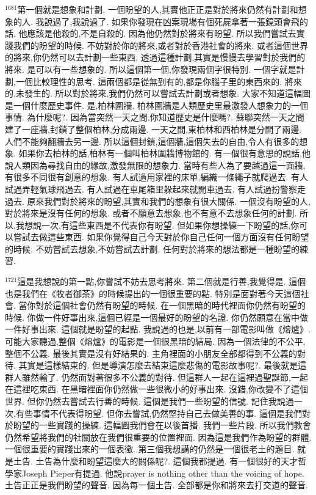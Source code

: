 \documentclass{book}
\begin{document}
$^{1681}$第一個就是想象和計劃.
一個盼望的人,其實他正正是對於將來仍然有計劃和想象的人.
我說過了,我說過了.
如果你發現在凶案現場有個死屍拿著一張鏡頭會飛的話.
他應該是他殺的,不是自殺的.
因為他仍然對於將來有盼望.
所以我們嘗試去實踐我們的盼望的時候.
不妨對於你的將來,或者對於香港社會的將來.
或者這個世界的將來,你仍然可以去計劃一些東西.
透過這種計劃,其實是慢慢去學習對於我們的將來.
是可以有一些想象的.
所以這個第一個,你發現兩個字很特別.
一個字就是計劃,一個比較理性的思考.
這兩個都是從無到有的,都是你腦子里的東西來的.
將來的,未發生的.
所以對於將來,我們仍然可以嘗試去計劃或者想象.
大家不知道這幅圖是一個什麼歷史事件.
是,柏林圍牆.
柏林圍牆是人類歷史里最激發人想象力的一個事情.
為什麼呢?.
因為當突然一天之間,你知道歷史是什麼嗎?.
蘇聯突然一天之間建了一座牆,封鎖了整個柏林,分成兩邊.
一天之間,東柏林和西柏林是分開了兩邊.
人們不能夠翻牆去另一邊.
所以這個封鎖,這個牆,這個失去的自由,令人有很多的想象.
如果你去柏林的話,柏林有一個叫柏林圍牆博物館的.
有一個很有意思的說話,他說人類因為尋找自由的緣故,激發無限的想象力.
當時有些人為了要越過這一面牆,有很多不同很有創意的想象.
有人試過用家裡的床單,編織一條繩子就爬過去.
有人試過弄輕氣球飛過去.
有人試過在車尾箱里躲起來就開車過去.
有人試過扮警察走過去.
原來我們對於將來的盼望,其實和我們的想象有很大關係.
一個沒有盼望的人,對於將來是沒有任何的想象.
或者不願意去想象,也不有意不去想象任何的計劃.
所以,我想說一次,有這些東西是不代表你有盼望.
但如果你想操練一下盼望的話,你可以嘗試去做這些東西.
如果你覺得自己今天對於你自己任何一個方面沒有任何盼望的時候.
不妨嘗試去想象,不妨嘗試去計劃.
任何對於將來的想法都是一種盼望的練習.

$^{1721}$這是我想說的第一點,你嘗試不妨去思考將來.
第二個就是行善,我覺得是.
這個也是我們在《牧者御茶》的時候提出的一個很重要的點.
特別是面對著今天這個社會.
當你對於這個社會仍然有盼望的時候.
在一個黑暗的時代裡面你仍然有盼望的時候.
你做一件好事出來,這個已經是一個最好的盼望的名證.
你仍然願意在當中做一件好事出來.
這個就是盼望的起點.
我說過的也是,以前有一部電影叫做《熔爐》.
可能大家聽過,整個《熔爐》的電影是一個很黑暗的結局.
因為一個法律的不公平,整個不公義.
最後其實是沒有好結果的.
主角裡面的小朋友全部都得到不公義的對待.
其實是這樣結束的.
但是導演怎麼去結束這麼悲傷的電影故事呢?.
最後就是這群人雖然輸了.
仍然面對著很多不公義的對待.
但這群人一起在這裡過聖誕節,一起在這裡吃東西.
在黑暗裡面你仍然做一些很微小的好事出來.
沒錯,你改變不了這個世界.
但你仍然去嘗試去行善的時候.
這個是我們一些盼望的信號.
記住我說過一次,有些事情不代表得盼望.
但你去嘗試,仍然堅持自己去做美善的事.
這個是我們對於盼望的一些實踐的操練.
這幅圖我們會在以後首播.
我們一些片段.
所以我們教會仍然希望將我們的社關放在我們很重要的位置裡面.
因為這是我們作為盼望的群體.
一個很重要的實踐出來的一個表徵.
第三個我想講的仍然是一個很老土的題目.
就是土告.
土告為什麼和盼望這麼大的關係呢?.
這個我都提過.
有一個很好的天才哲學家Joseph Pieper有提過.
他說prayer is nothing other than the voicing of hope.
土告正正是我們盼望的聲音.
因為每一個土告.
全部都是你和將來去打交道的聲音.
\end{document}
